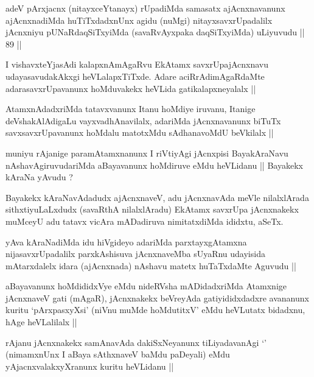 \begin{artha}
adeV pArxjacnx (nitayxceYtanayx) rUpadiMda samasatx ajAcnxnavanunx ajAcnxnadiMda huTiTxdadxnUnx agidu (nuMgi) nitayxsavxrUpadalilx jAcnxniyu pUNaRdaqSiTxyiMda (savaRvAyxpaka daqSiTxyiMda) uLiyuvudu || 89 ||
\end{artha}


\begin{artha}
I vishavxteYjasAdi kalapxnAmAgaRvu EkAtamx savxrUpajAcnxnavu udayasavudakAkxgi heVLalapxTiTxde. Adare aciRrAdimAgaRdaMte adarasavxrUpavanunx hoMduvakekx heVLida gatikalapxneyalalx ||
\end{artha}

\begin{artha}
AtamxnAdadxriMda tatavxvanunx Itanu hoMdiye iruvanu, Itanige deVshakAlAdigaLu vayxvadhAnavilalx, adariMda jAcnxnavanunx biTuTx savxsavxrUpavanunx hoMdalu matotxMdu sAdhanavoMdU beVkilalx ||
\end{artha}

\begin{artha}
muniyu rAjanige paramAtamxnanunx I riVtiyAgi jAcnxpisi BayakAraNavu nAshavAgiruvudariMda aBayavanunx hoMdiruve eMdu heVLidanu || Bayakekx kAraNa yAvudu ?
\end{artha}

\begin{artha}
Bayakekx kAraNavAdadudx ajAcnxnaveV, adu jAcnxnavAda meVle nilalxlArada sithxtiyuLaLxdudx (savaRthA nilalxlAradu) EkAtamx savxrUpa jAcnxnakekx muMceyU adu tatavx vicAra mADadiruva nimitatxdiMda ididxtu, aSeTx.
\end{artha}

\begin{artha}
yAva kAraNadiMda idu hiVgideyo adariMda parxtayxgAtamxna nijasavxrUpadalilx parxkAshisuva jAcnxnaveMba sUyaRnu udayisida mAtarxdalelx idara (ajAcnxnada) nAshavu matetx huTaTxdaMte Aguvudu ||
\end{artha}


\begin{artha}
aBayavanunx hoMdididxVye eMdu nideRVsha mADidadxriMda Atamxnige jAcnxnaveV gati (mAgaR), jAcnxnakekx beVreyAda gatiyididxdadxre avananunx kuritu `pArxpasxyXsi' (niVnu muMde hoMdutitxV' eMdu heVLutatx bidadxnu, hAge heVLalilalx ||
\end{artha}

\begin{artha}
rAjanu jAcnxnakekx samAnavAda dakiSxNeyanunx tiLiyadavanAgi `\stext' (nimamxnUnx I aBaya sAthxnaveV baMdu paDeyali) eMdu yAjacnxvalakxyXranunx kuritu heVLidanu ||
\end{artha}


